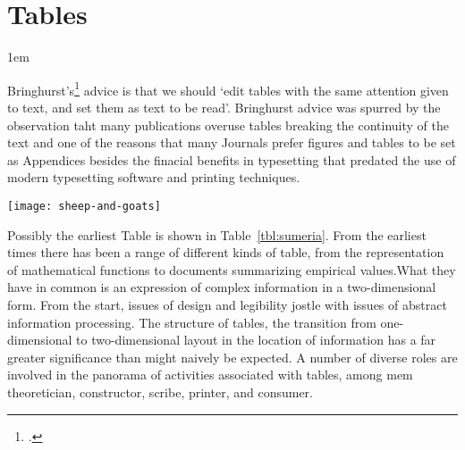 \chapter{Tables}

\parindent1em
\label{ch:tables}

Bringhurst's\footcite{Bringhurst2005} advice is that we should  `edit tables with the same 
attention given to text, and set them as text to be read'. Bringhurst advice was spurred by the observation taht many publications overuse tables 
breaking the continuity of the text and one of the reasons that many Journals prefer figures and 
tables to be set as Appendices besides the finacial benefits in typesetting that predated the
use of modern typesetting software and printing techniques.
\bigskip

\bgroup
\parindent=0pt

\hskip-0.2cm\texttt{[image: sheep-and-goats]}
\egroup
\bigskip


Possibly the earliest Table is shown in Table~\ref{tbl:sumeria}. From the earliest times there has been
a range of different kinds of table, from the representation of mathematical functions
to documents summarizing empirical values.What they have in common is an
expression of complex information in a two-dimensional form. From the start, issues
of design and legibility jostle with issues of abstract information processing. The
structure of tables, the transition from one-dimensional to two-dimensional layout
in the location of information has a far greater significance than might naively
be expected. A number of diverse roles are involved in the panorama of activities
associated with tables, among mem theoretician, constructor, scribe, printer, and
consumer.

